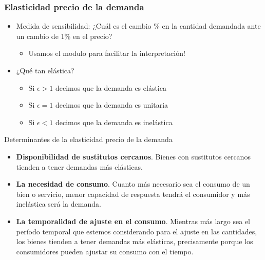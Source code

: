 \documentclass{beamer}
\begin{document}
\begin{frame}
\frametitle{Elasticidad precio de la demanda}
  \begin{itemize}
    \item Medida de sensibilidad: ¿Cuál es el cambio \% en la cantidad demandada ante un cambio de 1\% en el precio?
    \begin{itemize}
        \item Usamos el modulo para facilitar la interpretación! 
    \end{itemize}
    \item ¿Qué tan elástica?
    \begin{itemize}
      \item Si $\epsilon > 1$ decimos que la demanda es elástica
      \item Si $\epsilon = 1$ decimos que la demanda es unitaria
      \item Si $\epsilon < 1$ decimos que la demanda es inelástica
    \end{itemize}
  \end{itemize}
\end{frame}

\begin{frame}{Determinantes de la elasticidad precio de la demanda}
  \begin{itemize}
    \item \textbf{Disponibilidad de sustitutos cercanos}. Bienes con sustitutos cercanos tienden a tener demandas más elásticas.
    \item \textbf{La necesidad de consumo}. Cuanto más necesario sea el consumo de un bien o servicio, menor capacidad de
    respuesta tendrá el consumidor y más inelástica será la demanda.
    \item \textbf{La temporalidad de ajuste en el consumo}. Mientras más largo
    sea el período temporal que estemos considerando para el ajuste en las cantidades,
    los bienes tienden a tener demandas más elásticas, precisamente
    porque los consumidores pueden ajustar su consumo con el tiempo.
  \end{itemize}
\end{frame}
\end{document}
